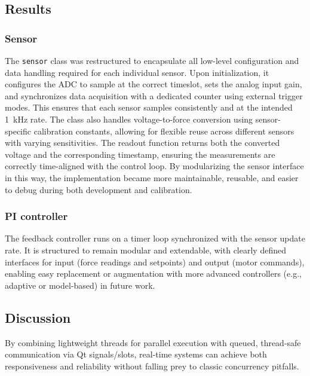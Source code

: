 \subsection{Results}




\subsubsection{Sensor}
The \texttt{sensor} class was restructured to encapsulate all low-level configuration and data handling required for each individual sensor. Upon initialization, it configures the ADC to sample at the correct timeslot, sets the analog input gain, and synchronizes data acquisition with a dedicated counter using external trigger modes. This ensures that each sensor samples consistently and at the intended \SI{1}{\kilo\hertz} rate. The class also handles voltage-to-force conversion using sensor-specific calibration constants, allowing for flexible reuse across different sensors with varying sensitivities. The readout function returns both the converted voltage and the corresponding timestamp, ensuring the measurements are correctly time-aligned with the control loop. By modularizing the sensor interface in this way, the implementation became more maintainable, reusable, and easier to debug during both development and calibration.

\subsubsection{PI controller}
The feedback controller runs on a timer loop synchronized with the sensor update rate. It is structured to remain modular and extendable, with clearly defined interfaces for input (force readings and setpoints) and output (motor commands), enabling easy replacement or augmentation with more advanced controllers (e.g., adaptive or model-based) in future work.

\subsection{Discussion}


By combining lightweight threads for parallel execution with queued, thread-safe communication via Qt signals/slots, real-time systems can achieve both responsiveness and reliability without falling prey to classic concurrency pitfalls.

